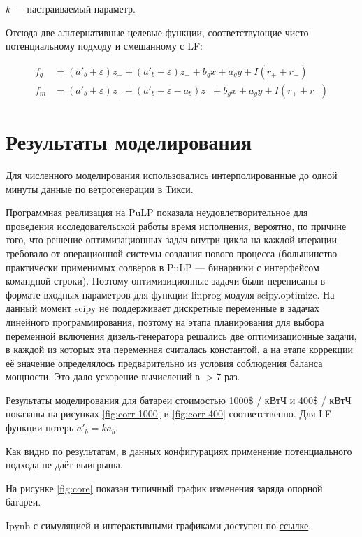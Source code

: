 \documentclass{report}
\def \eps {\varepsilon}
\begin{document}
$k$ --- настраиваемый параметр.

Отсюда две альтернативные целевые функции, соответствующие чисто потенциальному подходу и смешанному с LF:

\begin{equation}
\begin{split}
f_q &= (a'_b + \eps) z_+ + (a'_b - \eps) z_- + b_g x + a_g y + I(r_+ + r_-)\\
f_m &= (a'_b + \eps) z_+ + (a'_b - \eps - a_b) z_- + b_g x + a_g y + I(r_+ + r_-)
\end{split}
\end{equation}
         
\section{Результаты моделирования}
        
    Для численного моделирования использовались интерполированные до одной минуты данные по ветрогенерации в Тикси.
    
    Программная реализация на PuLP показала неудовлетворительное для проведения исследовательской работы время исполнения,
    вероятно, по причине того, что решение оптимизационных задач внутри цикла на каждой итерации требовало от операционной системы создания нового процесса
    (большинство практически применимых солверов в PuLP --- бинарники с интерфейсом командной строки).
    Поэтому оптимизиционные задачи были переписаны в формате входных параметров для функции linprog модуля scipy.optimize.
    На данный момент scipy не поддерживает дискретные переменные в задачах линейного программирования, поэтому на этапа планирования для выбора переменной включения дизель-генератора решались две оптимизационные задачи, в каждой из которых эта переменная считалась константой, а на этапе коррекции её значение определялось предварительно из условия соблюдения баланса мощности.
    Это дало ускорение вычислений в $>7$ раз.
    
    Результаты моделирования для батареи стоимостью 1000\$ / кВтЧ и 400\$ / кВтЧ показаны на рисунках \ref{fig:corr-1000} и \ref{fig:corr-400} соответственно.
    Для LF-функции потерь $a'_b = k a_b$.
    
    Как видно по результатам, в данных конфигурациях применение потенциального подхода не даёт выигрыша.
    
    На рисунке \ref{fig:core} показан типичный график изменения заряда опорной батареи.
    
    Ipynb с симуляцией и интерактивными графиками доступен по  \href{https://github.com/niquepolice/electro/blob/milp/milp.ipynb}{ссылке}.
    
\end{document}
